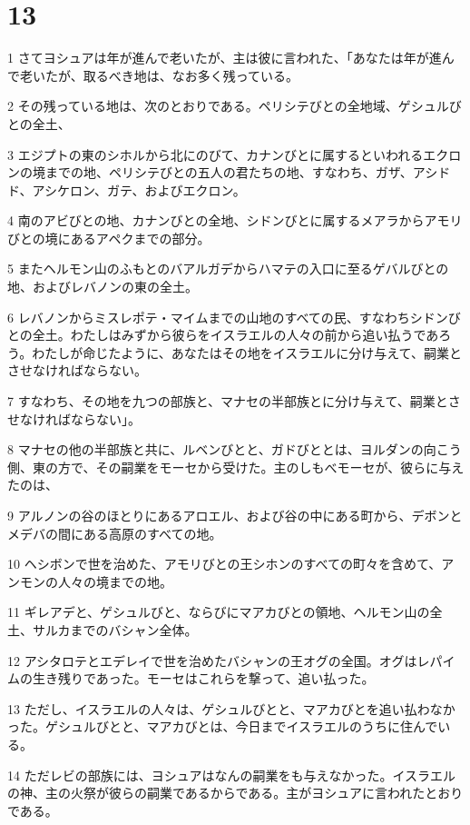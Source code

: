 \chapter{13}

\par 1 さてヨシュアは年が進んで老いたが、主は彼に言われた、「あなたは年が進んで老いたが、取るべき地は、なお多く残っている。
\par 2 その残っている地は、次のとおりである。ペリシテびとの全地域、ゲシュルびとの全土、
\par 3 エジプトの東のシホルから北にのびて、カナンびとに属するといわれるエクロンの境までの地、ペリシテびとの五人の君たちの地、すなわち、ガザ、アシドド、アシケロン、ガテ、およびエクロン。
\par 4 南のアビびとの地、カナンびとの全地、シドンびとに属するメアラからアモリびとの境にあるアペクまでの部分。
\par 5 またヘルモン山のふもとのバアルガデからハマテの入口に至るゲバルびとの地、およびレバノンの東の全土。
\par 6 レバノンからミスレポテ・マイムまでの山地のすべての民、すなわちシドンびとの全土。わたしはみずから彼らをイスラエルの人々の前から追い払うであろう。わたしが命じたように、あなたはその地をイスラエルに分け与えて、嗣業とさせなければならない。
\par 7 すなわち、その地を九つの部族と、マナセの半部族とに分け与えて、嗣業とさせなければならない」。
\par 8 マナセの他の半部族と共に、ルベンびとと、ガドびととは、ヨルダンの向こう側、東の方で、その嗣業をモーセから受けた。主のしもべモーセが、彼らに与えたのは、
\par 9 アルノンの谷のほとりにあるアロエル、および谷の中にある町から、デボンとメデバの間にある高原のすべての地。
\par 10 ヘシボンで世を治めた、アモリびとの王シホンのすべての町々を含めて、アンモンの人々の境までの地。
\par 11 ギレアデと、ゲシュルびと、ならびにマアカびとの領地、ヘルモン山の全土、サルカまでのバシャン全体。
\par 12 アシタロテとエデレイで世を治めたバシャンの王オグの全国。オグはレパイムの生き残りであった。モーセはこれらを撃って、追い払った。
\par 13 ただし、イスラエルの人々は、ゲシュルびとと、マアカびとを追い払わなかった。ゲシュルびとと、マアカびとは、今日までイスラエルのうちに住んでいる。
\par 14 ただレビの部族には、ヨシュアはなんの嗣業をも与えなかった。イスラエルの神、主の火祭が彼らの嗣業であるからである。主がヨシュアに言われたとおりである。
